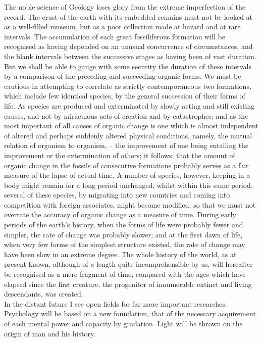 \indent The noble science of Geology loses glory from the extreme imperfection of the record. The crust of the earth with its embedded remains must not be looked at as a well-filled museum, but as a poor collection made at hazard and at rare intervals. The accumulation of each great fossiliferous formation will be recognised as having depended on an unusual concurrence of circumstances, and the blank intervals between the successive stages as having been of vast duration. But we shall be able to gauge with some security the duration of these intervals by a comparison of the preceding and succeeding organic forms. We must be cautious in attempting to correlate as strictly contemporaneous two formations, which include few identical species, by the general succession of their forms of life.  As species are produced and exterminated by slowly acting and still existing causes, and not by miraculous acts of creation and by catastrophes; and as the most important of all causes of organic change is one which is almost independent of altered and perhaps suddenly altered physical conditions, namely, the mutual relation of organism to organism, -- the improvement of one being entailing the improvement or the extermination of others; it follows, that the amount of organic change in the fossils of consecutive formations probably serves as a fair measure of the lapse of actual time. A number of species, however, keeping in a body might remain for a long period unchanged, whilst within this same period, several of these species, by migrating into new countries and coming into competition with foreign associates, might become modified; so that we must not overrate the accuracy of organic change as a measure of time.  During early periods of the earth's history, when the forms of life were probably fewer and simpler, the rate of change was probably slower; and at the first dawn of life, when very few forms of the simplest structure existed, the rate of change may have been slow in an extreme degree. The whole history of the world, as at present known, although of a length quite incomprehensible by us, will hereafter be recognised as a mere fragment of time, compared with the ages which have elapsed since the first creature, the progenitor of innumerable extinct and living descendants, was created.~\\
\indent In the distant future I see open fields for far more important researches. Psychology will be based on a new foundation, that of the necessary acquirement of each mental power and capacity by gradation. Light will be thrown on the origin of man and his history.~\\
